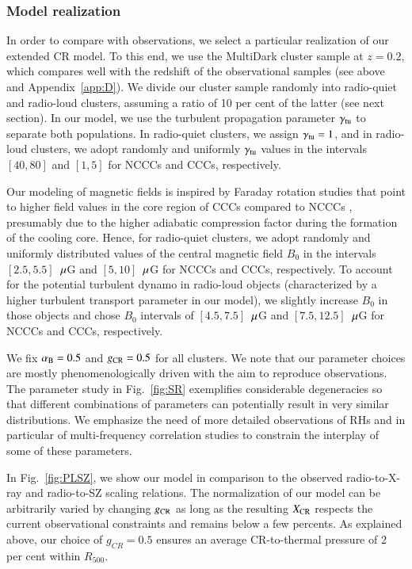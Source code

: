 \documentclass[useAMS,usenatbib]{mn2e}
\begin{document}
\subsubsection{Model realization}

In order to compare with observations, we select a particular realization of our
extended CR model. To this end, we use the MultiDark cluster sample at $z=0.2$,
which compares well with the redshift of the observational samples (see above
and Appendix~\ref{app:D}). We divide our cluster sample randomly into
radio-quiet and radio-loud clusters, assuming a ratio of 10 per cent of the
latter (see next section). In our model, we use the turbulent propagation
parameter $\gamma_{{\mathrm{tu}}}$ to separate both populations. In radio-quiet
clusters, we assign $\gamma_{{\mathrm{tu}}}=1$, and in radio-loud clusters, we adopt
randomly and uniformly $\gamma_{{\mathrm{tu}}}$ values in the intervals $[40,80]$ and
$[1,5]$ for NCCCs and CCCs, respectively.

Our modeling of magnetic fields is inspired by Faraday rotation studies that
point to higher field values in the core region of CCCs compared to NCCCs
\citep{2010A&A...513A..30B,2011A&A...529A..13K}, presumably due to the higher
adiabatic compression factor during the formation of the cooling core. Hence,
for radio-quiet clusters, we adopt randomly and uniformly distributed values of
the central magnetic field $B_0$ in the intervals $[2.5,5.5]$~$\mu$G and
$[5,10]$~$\mu$G for NCCCs and CCCs, respectively. To account for the potential
turbulent dynamo in radio-loud objects (characterized by a higher turbulent
transport parameter in our model), we slightly increase $B_0$ in those objects
and chose $B_0$ intervals of $[4.5,7.5]$~$\mu$G and $[7.5,12.5]$~$\mu$G for
NCCCs and CCCs, respectively.

We fix $\alpha_{{\mathrm{B}}}=0.5$ and $g_{{\mathrm{CR}}}=0.5$ for all clusters. We note
that our parameter choices are mostly phenomenologically driven with the aim to
reproduce observations. The parameter study in Fig.~\ref{fig:SR} exemplifies
considerable degeneracies so that different combinations of parameters can
potentially result in very similar distributions. We emphasize the need of more
detailed observations of RHs and in particular of multi-frequency
correlation studies to constrain the interplay of some of these parameters.

In Fig.~\ref{fig:PLSZ}, we show our model in comparison to the observed
radio-to-X-ray and radio-to-SZ scaling relations. The normalization of our model
can be arbitrarily varied by changing $g_{{\mathrm{CR}}}$ as long as the resulting
$X_{{\mathrm{CR}}}$ respects the current observational constraints and remains below
a few percents. As explained above, our choice of $g_{CR}=0.5$ ensures an
average CR-to-thermal pressure of 2 per cent within $R_{500}$.
\end{document}

